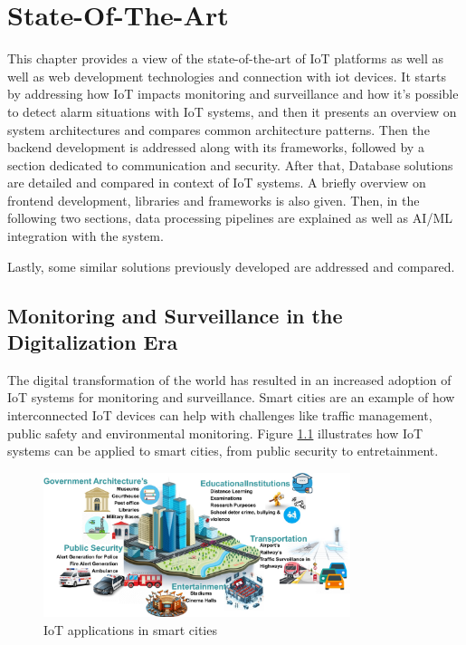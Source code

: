 
%

\chapter{State-Of-The-Art}
\label{cha:State-Of-The-Art}

This chapter provides a view of the state-of-the-art of \gls{IoT} platforms as well
as well as web development technologies and connection with iot devices.
It starts by addressing how \gls{IoT} impacts monitoring and surveillance and how it's
possible to detect alarm situations with \gls{IoT} systems, and then it presents an overview on system architectures and compares common
architecture patterns. Then the backend development is addressed along with
its frameworks, followed by a section dedicated to communication and security.
After that, Database solutions are detailed and compared in context of IoT
systems. A briefly overview on frontend development, libraries and frameworks is
also given.
Then, in the following two sections, data processing pipelines are explained as
well as \gls{AI}/\gls{ML} integration with the system.

Lastly, some similar solutions previously developed are addressed and compared.

\section{Monitoring and Surveillance in the Digitalization Era}
The digital transformation of the world has resulted in an increased adoption
of \gls{IoT} systems for monitoring and surveillance. Smart cities are an
example of how interconnected \gls{IoT} devices can help with challenges
like traffic management, public safety and environmental monitoring. Figure
\ref{fig:monitoring:smartcities}
illustrates how \gls{IoT} systems can be applied to smart cities, from public
security to entretainment.

\begin{figure}[H]
	\centering
	\includegraphics[width=0.8\textwidth, height=0.5\textheight, keepaspectratio]{Chapters/Figures/Monitoring/SmartCities.png}
	\caption{IoT applications in smart cities\cite{sharma2024}}
	\label{fig:monitoring:smartcities}
\end{figure}


